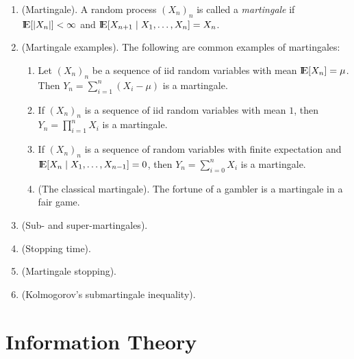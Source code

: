 \documentclass[a4paper,10pt]{article}
\begin{document}
\begin{enumerate}
 \item (Martingale). A random process $(X_n)_n$ is called a \textit{martingale} if 
		     $\E[|X_n|]<\infty$ and $\E[X_{n+1}{}\mid{}X_1,\ldots, X_n]=X_{n}$.
 \item (Martingale examples). The following are common examples of martingales:
  \begin{enumerate}
   \item Let $(X_n)_n$ be a sequence of iid random variables with mean $\E[X_n]=\mu$. Then
         $Y_n = \sum_{i=1}^{n}(X_i-\mu)$ is a martingale.
   \item If $(X_n)_n$ is a sequence of iid random variables with mean $1$, then 
         $Y_n = \prod_{i=1}^{n}X_i$ is a martingale.
   \item If $(X_n)_n$ is a sequence of random variables with finite expectation and 
         $\E[X_n{}\mid{}X_1,\ldots,X_{n-1}]=0$, then $Y_n=\sum_{i=0}^{n}X_i$ is a 
         martingale.
   \item (The classical martingale). The fortune of a gambler is a martingale in a fair game.
  \end{enumerate}
 \item (Sub- and super-martingales).
 \item (Stopping time).
 \item (Martingale stopping).
 \item (Kolmogorov's submartingale inequality).
\end{enumerate}



\section{Information Theory}
\end{document}
